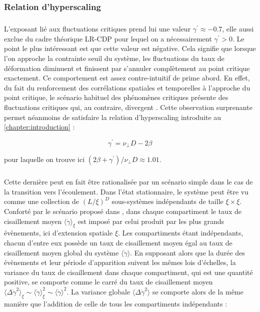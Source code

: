 \subsubsection{Relation d'hyperscaling}

\subparagraph{}L'exposant lié aux fluctuations critiques prend lui une valeur $\gamma^\prime \approx -0.7$, elle aussi exclue du cadre théorique LR-CDP pour lequel on a nécessairement $\gamma^\prime>0$. Le point le plus intéressant est que cette valeur est négative. Cela signifie que lorsque l'on approche la contrainte seuil du système, les fluctuations du taux de déformation diminuent et finissent par s'annuler complètement au point critique exactement. Ce comportement est assez contre-intuitif de prime abord. En effet, du fait du renforcement des corrélations spatiales et temporelles à l'approche du point critique, le scénario habituel des phénomènes critiques présente des fluctuations critiques qui, au contraire, divergent \cite{kardar_statistical_2007}. Cette observation surprenante permet néanmoins de satisfaire la relation d'hyperscaling introduite au \autoref{chapter:introduction} :

\begin{equation}
	\gamma^\prime = \nu_\perp D - 2\beta
	\label{eq:hyperscalingEPM}
\end{equation}

\noindent pour laquelle on trouve ici $(2\beta + \gamma^\prime) / \nu_\perp D\approx 1.01$.  

\subparagraph{}Cette dernière peut en fait être rationalisée par un scénario simple dans le cas de la transition vers l'écoulement. Dans l'état stationnaire, le système peut être vu comme une collection de $(L/\xi)^D$ sous-systèmes indépendants de taille $\xi \times \xi$. Conforté par le scénario proposé dans \cite{lin_scaling_2014}, dans chaque compartiment le taux de cisaillement moyen $\langle\dot{\gamma}\rangle_\xi$ est imposé par celui produit par les plus grands évènements, ici d'extension spatiale $\xi$. Les compartiments étant indépendants, chacun d'entre eux possède un taux de cisaillement moyen égal au taux de cisaillement moyen global du système $\langle \dot{\gamma} \rangle$. En supposant alors que la durée des évènements et leur période d'apparition suivent les mêmes lois d'échelles, la variance du taux de cisaillement dans chaque compartiment, qui est une quantité positive, se comporte comme le carré du taux de cisaillement moyen $\langle \Delta\dot{\gamma}^2 \rangle_\xi \sim \langle\dot{\gamma}\rangle_\xi^2 \sim \langle\dot{\gamma}\rangle^2$. La variance globale $\langle \Delta\dot{\gamma}^2 \rangle$ se comporte alors de la même manière que l'addition de celle de tous les compartiments indépendants :

